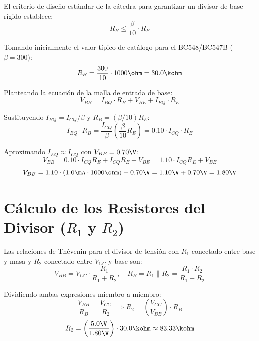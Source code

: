 El criterio de diseño estándar de la cátedra para garantizar un divisor de base rígido establece:
\begin{equation}
  R_B \le \frac{\beta}{10} \cdot R_E
  \label{eq:criterio_rb}
\end{equation}

Tomando inicialmente el valor típico de catálogo para el BC548/BC547B ($\beta = 300$):
\begin{equation}
  R_B = \frac{300}{10} \cdot 1000\ohm = 30.0\kohm
\end{equation}

Planteando la ecuación de la malla de entrada de base:
\begin{equation}
  V_{BB} = I_{BQ} \cdot R_B + V_{BE} + I_{EQ} \cdot R_E
  \label{eq:malla_thevenin}
\end{equation}

Sustituyendo $I_{BQ} = I_{CQ}/\beta$ y $R_B = (\beta/10) R_E$:
\begin{equation}
  I_{BQ} \cdot R_B = \frac{I_{CQ}}{\beta} \left(\frac{\beta}{10} R_E\right) = 0.10 \cdot I_{CQ} \cdot R_E
\end{equation}

Aproximando $I_{EQ} \approx I_{CQ}$ con $V_{BE} = 0.70\V$:
\begin{equation}
  V_{BB} = 0.10 \cdot I_{CQ} R_E + I_{CQ} R_E + V_{BE} = 1.10 \cdot I_{CQ} R_E + V_{BE}
\end{equation}
\begin{equation}
  V_{BB} = 1.10 \cdot (1.0\mA \cdot 1000\ohm) + 0.70\V = 1.10\V + 0.70\V = 1.80\V
  \label{eq:VBB_calculada}
\end{equation}

\section{Cálculo de los Resistores del Divisor ($R_1$ y $R_2$)}

Las relaciones de Thévenin para el divisor de tensión con $R_1$ conectado entre base y masa y $R_2$ conectado
entre $V_{CC}$ y base son:
\begin{equation}
  V_{BB} = V_{CC} \cdot \frac{R_1}{R_1 + R_2}, \quad R_B = R_1 \parallel R_2 = \frac{R_1 \cdot R_2}{R_1 + R_2}
\end{equation}

Dividiendo ambas expresiones miembro a miembro:
\begin{equation}
  \frac{V_{BB}}{R_B} = \frac{V_{CC}}{R_2} \implies R_2 = \left(\frac{V_{CC}}{V_{BB}}\right) \cdot R_B
\end{equation}
\begin{equation}
  R_2 = \left(\frac{5.0\V}{1.80\V}\right) \cdot 30.0\kohm \approx 83.33\kohm
  \label{eq:R2_teorico}
\end{equation}

